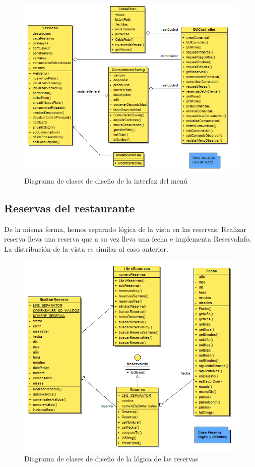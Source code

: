 \documentclass[spanish,a4paper,11pt, twoside]{report}	%
\begin{document}
		\begin{figure}[!h]
		\centering
		\includegraphics[scale=0.5]{DCDvistamenu.png}
		\caption{Diagrama de clases de diseño de la interfaz del menú }
		\end{figure}

\clearpage

		\subsection{Reservas del restaurante}
		De la misma forma, hemos separado lógica de la vista en las reservas. Realizar reserva lleva una reserva que a su vez lleva una fecha e implementa ReservaInfo. La distribución de la vista es similar al caso anterior.
		\begin{figure}[!h]
		\centering
		\includegraphics[scale=0.5]{DCDreservas.png}
		\caption{Diagrama de clases de diseño de la lógica de las reservas}
		\end{figure}
\end{document}
